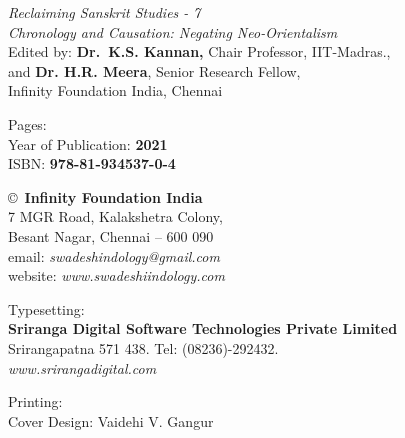 \thispagestyle{empty}

\noindent
{\fontsize{9}{11}\selectfont\sl Reclaiming Sanskrit Studies - 7}\\
\textit{Chronology and Causation: Negating Neo-Orientalism}\\
Edited by: {\bf Dr.\ K.S. Kannan,} Chair Professor, IIT-Madras.,\\
and {\bf Dr. H.R. Meera}, Senior Research Fellow,\\
 Infinity Foundation India, Chennai\\
\vfill

\noindent
Pages: {\bf\pageref{bookend}}\\
Year of Publication: {\bf 2021}\\
ISBN: {\bf 978-81-934537-0-4}\\
\vfill

\noindent
\copyright\ {\bf Infinity Foundation India}\\ 
7 MGR Road, Kalakshetra Colony,\\ 
Besant Nagar, Chennai -- 600 090\\
email: {\sl swadeshindology@gmail.com}\\
website: {\sl www.swadeshiindology.com} 
\vfill

\noindent
Typesetting:\\ 
{\bf Sriranga Digital Software Technologies Private Limited}\\ 
Srirangapatna 571 438. Tel: (08236)-292432.\\
{\sl www.srirangadigital.com}
\vfill

\noindent
Printing:\\

\noindent
Cover Design: Vaidehi V. Gangur\\ 
